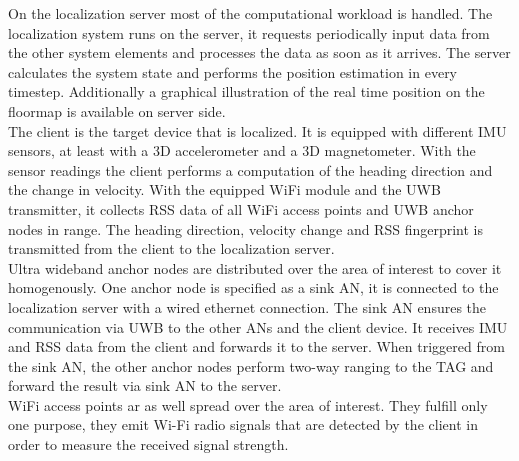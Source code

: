 \noindent\hspace*{5mm}%
On the localization server most of the computational workload is handled. The localization system runs on the server, it requests periodically input data from the other system elements and processes the data as soon as it arrives. The server calculates the system state and performs the position estimation in every timestep. Additionally a graphical illustration of the real time position on the floormap is available on server side. \\
\noindent\hspace*{5mm}%
The client is the target device that is localized. It is equipped with different IMU sensors, at least with a 3D accelerometer and a 3D magnetometer. With the sensor readings the client performs a computation of the heading direction and the change in velocity. With the equipped WiFi module and the UWB transmitter, it collects RSS data of all WiFi access points and UWB anchor nodes in range. The heading direction, velocity change and RSS fingerprint is transmitted from the client to the localization server.\\
\noindent\hspace*{5mm}%
Ultra wideband anchor nodes are distributed over the area of interest to cover it homogenously. One anchor node is specified as a sink AN, it is connected to the localization server with a wired ethernet connection. The sink AN ensures the communication via UWB to the other ANs and the client device. It receives IMU and RSS data from the client and forwards it to the server. When triggered from the sink AN, the other anchor nodes perform two-way ranging to the TAG and forward the result via sink AN to the server.\\
\noindent\hspace*{5mm}%
WiFi access points ar as well spread over the area of interest. They fulfill only one purpose, they emit Wi-Fi radio signals that are detected by the client in order to measure the received signal strength. 


